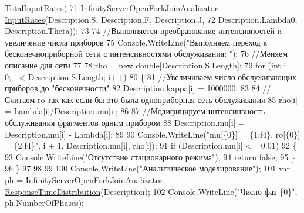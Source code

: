 \begin{DoxyCode}
      \hyperlink{class_exact_network_analysis_1_1_infinity_server_open_fork_join_analizator_aa6f6f71f9d588a2a98ee4b4849013050}{TotalInputRates}(
71                              \hyperlink{class_exact_network_analysis_1_1_infinity_server_open_fork_join_analizator}{InfinityServerOpenForkJoinAnalizator}.
      \hyperlink{class_exact_network_analysis_1_1_infinity_server_open_fork_join_analizator_a3ade97ca1f8742b8f289bd2a41b2ae89}{InputRates}(Description.S, Description.F, Description.J,
72                                  Description.Lambda0, Description.Theta)); 
73 
74             \textcolor{comment}{//Выполняется преобразование интенсивностей и увеличение числа приборов}
75             Console.WriteLine(\textcolor{stringliteral}{"Выполняем переход к бесконечноприборной сети с интенсивностями обслуживания:
      "}); 
76             \textcolor{comment}{//Меняем описание для сети}
77 
78             rho = \textcolor{keyword}{new} \textcolor{keywordtype}{double}[Description.S.Length]; 
79             \textcolor{keywordflow}{for} (\textcolor{keywordtype}{int} i = 0; i < Description.S.Length; i++)
80             \{
81                 \textcolor{comment}{//Увеличиваем число обслуживающих приборов до "бесконечности"}
82                 Description.kappa[i] = 1000000;
83 
84                 \textcolor{comment}{//Считаем ro так как если бы это была одноприборная сеть обслуживания}
85                 rho[i] = Lambda[i]/Description.mu[i]; 
86 
87                 \textcolor{comment}{//Модифицируем интенсинвность обслуживания фрагментов одним прибором}
88                 Description.mu[i] = Description.mu[i] - Lambda[i]; 
89 
90                 Console.WriteLine(\textcolor{stringliteral}{"mu[\{0\}] = \{1:f4\}, ro[\{0\}] = \{2:f4\}"}, i + 1, Description.mu[i], rho[i]);
91                 \textcolor{keywordflow}{if} (Description.mu[i] <= 0.01)
92                 \{
93                     Console.WriteLine(\textcolor{stringliteral}{"Отсутствие стационарного режима"});
94                     \textcolor{keywordflow}{return} \textcolor{keyword}{false}; 
95                 \}
96             \}
97 
98         
99 
100             Console.WriteLine(\textcolor{stringliteral}{"Аналитическое моделирование"}); 
101             var ph = \hyperlink{class_exact_network_analysis_1_1_infinity_server_open_fork_join_analizator}{InfinityServerOpenForkJoinAnalizator}.
      \hyperlink{class_exact_network_analysis_1_1_infinity_server_open_fork_join_analizator_a4b7ce8b06e8eabf86de585c8119b9d59}{ResponseTimeDistribution}(Description);
102             Console.WriteLine(\textcolor{stringliteral}{"Число фаз \{0\}"}, ph.NumberOfPhases); 

\end{DoxyCode}

